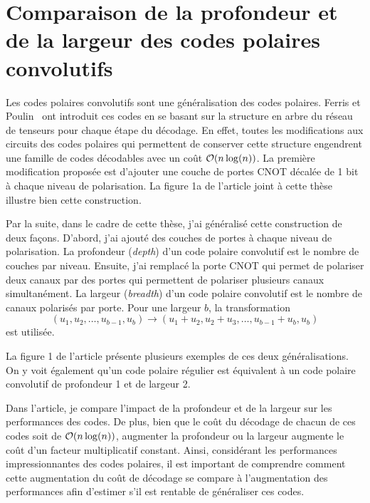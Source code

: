 \section{Comparaison de la profondeur et de la largeur des codes polaires convolutifs}

Les codes polaires convolutifs sont une généralisation des codes polaires.
Ferris et Poulin~\cite{ferris_branching_2014} ont introduit ces codes
en se basant sur la structure en arbre du réseau de tenseurs pour 
chaque étape du décodage.
En effet, 
toutes les modifications aux circuits des codes polaires qui permettent
de conserver cette structure engendrent une famille de codes décodables
avec un coût $\mathcal{O}(n \log(n))$.
La première modification proposée est d'ajouter 
une couche de portes CNOT décalée de 1 bit à chaque niveau de polarisation.
La figure 1a de l'article joint à cette thèse illustre bien cette construction.

Par la suite,
dans le cadre de cette thèse,
j'ai généralisé cette construction de deux façons.
D'abord,
j'ai ajouté des couches de portes à chaque niveau de polarisation.
La profondeur (\textit{depth}) d'un code polaire convolutif est
le nombre de couches par niveau.
Ensuite, j'ai remplacé la porte CNOT qui
permet de polariser deux canaux par des portes qui permettent de polariser plusieurs 
canaux simultanément.
La largeur (\textit{breadth}) d'un code polaire convolutif est le nombre de
canaux polarisés par porte.
Pour une largeur $b$, 
la transformation
\begin{equation}
  (u_1, u_2, \ldots, u_{b-1}, u_b) 
  \to 
  (u_1 + u_2, u_2 + u_3, \ldots, u_{b-1} + u_b, u_b) 
\end{equation}
est utilisée.

La figure 1 de l'article présente plusieurs exemples de ces deux généralisations.
On y voit également qu'un code polaire régulier est équivalent à un code polaire convolutif
de profondeur 1 et de largeur 2.

Dans l'article,
je compare l'impact de la profondeur et de la largeur sur les performances des codes.
De plus, 
bien que le coût du décodage de chacun de ces codes soit de $\mathcal{O}(n \log(n))$,
augmenter la profondeur ou la largeur augmente le coût d'un facteur multiplicatif constant.
Ainsi,
considérant les performances impressionnantes des codes polaires,
il est important de comprendre comment cette augmentation du coût de décodage 
se compare à l'augmentation des performances
afin d'estimer s'il est rentable de généraliser ces codes.

